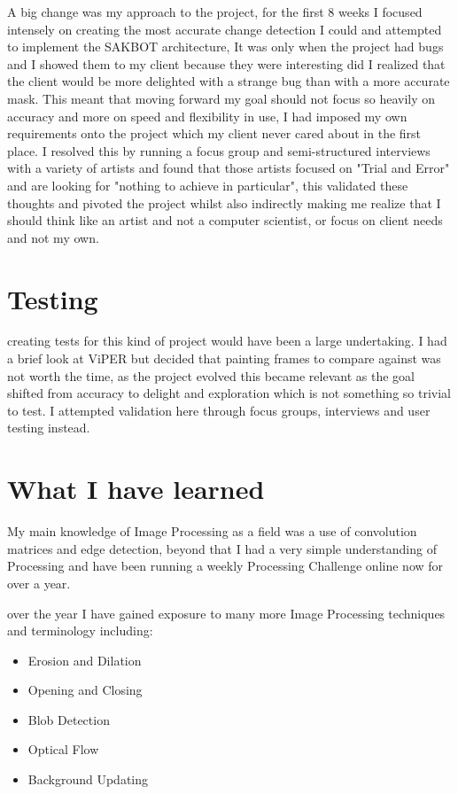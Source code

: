 \documentclass[a4paper]{report}
\begin{document}
A big change was my approach to the project, for the first 8 weeks I focused intensely on creating the most accurate change detection I could and attempted to implement the SAKBOT architecture\cite{SAKBOT}, It was only when the project had bugs and I showed them to my client because they were interesting did I realized that the client would be more delighted with a strange bug than with a more accurate mask. This meant that moving forward my goal should not focus so heavily on accuracy and more on speed and flexibility in use, I had imposed my own requirements onto the project which my client never cared about in the first place. I resolved this by running a focus group and semi-structured interviews with a variety of artists and found that those artists focused on "Trial and Error" and are looking for "nothing to achieve in particular", this validated these thoughts and pivoted the project whilst also indirectly making me realize that I should think like an artist and not a computer scientist, or focus on client needs and not my own.

\section{Testing}
creating tests for this kind of project would have been a large undertaking. I had a brief look at ViPER\cite{VIPER} but decided that painting frames to compare against was not worth the time, as the project evolved this became relevant as the goal shifted from accuracy to delight and exploration which is not something so trivial to test. I attempted validation here through focus groups, interviews and user testing instead.

\section{What I have learned}
My main knowledge of Image Processing as a field was a use of convolution matrices and edge detection, beyond that I had a very simple understanding of Processing and have been running a weekly Processing Challenge online now for over a year.

over the year I have gained exposure to many more Image Processing techniques and terminology including:

\begin{itemize}
\item Erosion and Dilation
\item Opening and Closing
\item Blob Detection
\item Optical Flow
\item Background Updating
\end{itemize}
\end{document}
